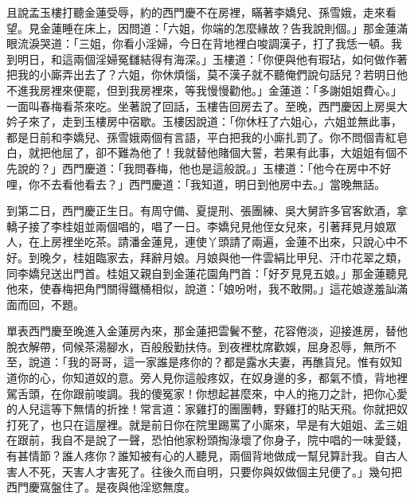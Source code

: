 且說孟玉樓打聽金蓮受辱，約的西門慶不在房裡，瞞著李嬌兒、孫雪娥，走來看望。見金蓮睡在床上，因問道：「六姐，你端的怎麼緣故？告我說則個。」那金蓮滿眼流淚哭道：「三姐，你看小淫婦，今日在背地裡白唆調漢子，打了我恁一頓。我到明日，和這兩個淫婦冤讎結得有海深。」玉樓道：「你便與他有瑕玷，如何做作著把我的小廝弄出去了？六姐，你休煩惱，莫不漢子就不聽俺們說句話兒？若明日他不進我房裡來便罷，但到我房裡來，等我慢慢勸他。」金蓮道：「多謝姐姐費心。」一面叫春梅看茶來吃。坐著說了回話，玉樓告回房去了。至晚，西門慶因上房吳大妗子來了，走到玉樓房中宿歇。玉樓因說道：「你休枉了六姐心，六姐並無此事，都是日前和李嬌兒、孫雪娥兩個有言語，平白把我的小廝扎罰了。你不問個青紅皂白，就把他屈了，卻不難為他了！我就替他賭個大誓，若果有此事，大姐姐有個不先說的？」西門慶道：「我問春梅，他也是這般說。」玉樓道：「他今在房中不好哩，你不去看他看去？」西門慶道：「我知道，明日到他房中去。」當晚無話。

到第二日，西門慶正生日。有周守備、夏提刑、張團練、吳大舅許多官客飲酒，拿轎子接了李桂姐並兩個唱的，唱了一日。李嬌兒見他侄女兒來，引著拜見月娘眾人，在上房裡坐吃茶。請潘金蓮見，連使丫頭請了兩遍，金蓮不出來，只說心中不好。到晚夕，桂姐臨家去，拜辭月娘。月娘與他一件雲絹比甲兒、汗巾花翠之類，同李嬌兒送出門首。桂姐又親自到金蓮花園角門首：「好歹見見五娘。」那金蓮聽見他來，使春梅把角門關得鐵桶相似，說道：「娘吩咐，我不敢開。」這花娘遂羞訕滿面而回，不題。

單表西門慶至晚進入金蓮房內來，那金蓮把雲鬢不整，花容倦淡，迎接進房，替他脫衣解帶，伺候茶湯腳水，百般殷勤扶侍。到夜裡枕席歡娛，屈身忍辱，無所不至，說道：「我的哥哥，這一家誰是疼你的？都是露水夫妻，再醮貨兒。惟有奴知道你的心，你知道奴的意。旁人見你這般疼奴，在奴身邊的多，都氣不憤，背地裡駕舌頭，在你跟前唆調。我的傻冤家！你想起甚麼來，中人的拖刀之計，把你心愛的人兒這等下無情的折挫！常言道：家雞打的團團轉，野雞打的貼天飛。你就把奴打死了，也只在這屋裡。就是前日你在院里踢罵了小廝來，早是有大姐姐、孟三姐在跟前，我自不是說了一聲，恐怕他家粉頭掏淥壞了你身子，院中唱的一味愛錢，有甚情節？誰人疼你？誰知被有心的人聽見，兩個背地做成一幫兒算計我。自古人害人不死，天害人才害死了。往後久而自明，只要你與奴做個主兒便了。」幾句把西門慶窩盤住了。是夜與他淫慾無度。

